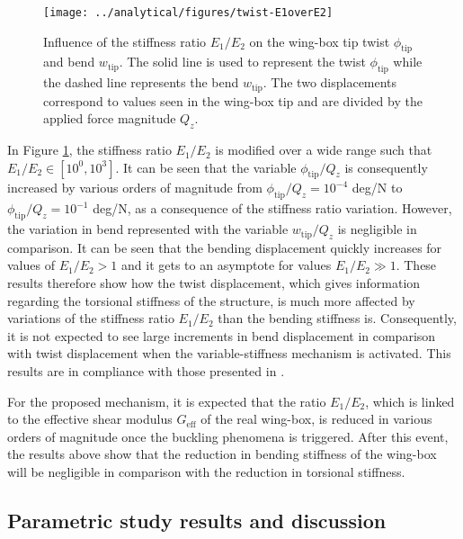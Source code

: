     \begin{figure}[!htpb] %
      \centering
      \texttt{[image: ../analytical/figures/twist-E1overE2]}
      \caption[Influence of the stiffness ratio on the wing-box tip twist and bend]{Influence of the stiffness ratio $E_1/E_2$ on the wing-box tip twist $\phi_{\mathrm{tip}}$ and bend $w_{\mathrm{tip}}$. The solid line is used to represent the twist $\phi_{\mathrm{tip}}$ while the dashed line represents the bend $w_{\mathrm{tip}}$. The two displacements correspond to values seen in the wing-box tip and are divided by the applied force magnitude $Q_z$.}\label{fig:twist-E1overE2}
    \end{figure}

    In Figure \ref{fig:twist-E1overE2}, the stiffness ratio $E_1/E_2$ is modified over a wide range such that $E_1/E_2 \in [10^{0}, 10^{3}]$. It can be seen that the variable $\phi_{\mathrm{tip}}/Q_z$ is consequently increased by various orders of magnitude from $\phi_{\mathrm{tip}}/Q_z = 10^{-4}$ deg/N to $\phi_{\mathrm{tip}}/Q_z = 10^{-1}$ deg/N, as a consequence of the stiffness ratio variation. However, the variation in bend represented with the variable $w_{\mathrm{tip}}/Q_z$ is negligible in comparison. It can be seen that the bending displacement quickly increases for values of $E_1/E_2 > 1$ and it gets to an asymptote for values $E_1/E_2 \gg 1$. These results therefore show how the twist displacement, which gives information regarding the torsional stiffness of the structure, is much more affected by variations of the stiffness ratio $E_1/E_2$ than the bending stiffness is. Consequently, it is not expected to see large increments in bend displacement in comparison with twist displacement when the variable-stiffness mechanism is activated. This results are in compliance with those presented in \cite{Raither2013a}.

    For the proposed mechanism, it is expected that the ratio $E_1/E_2$, which is linked to the effective shear modulus $G_{\mathrm{eff}}$ of the real wing-box, is reduced in various orders of magnitude once the buckling phenomena is triggered. After this event, the results above show that the reduction in bending stiffness of the wing-box will be negligible in comparison with the reduction in torsional stiffness.

  \subsection{Parametric study results and discussion} \label{subsec:results_parametricStudy}

